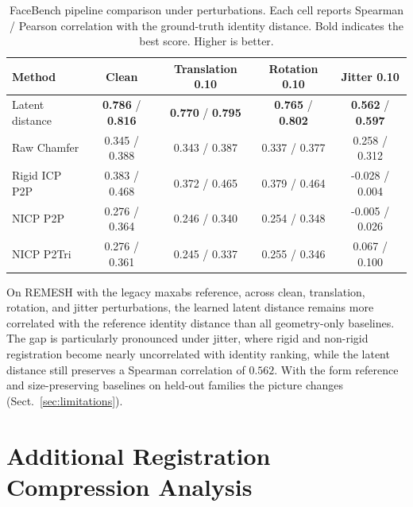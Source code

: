 \documentclass[10pt,twocolumn,letterpaper]{article}
\begin{document}
\begin{table}[h]
\centering
\small
\caption{
FaceBench pipeline comparison under perturbations. Each cell reports Spearman /
Pearson correlation with the ground-truth identity distance. Bold indicates the
best score. Higher is better.
}
\label{tab:facebench_pipeline_perturbed_app}
\begin{tabular}{lcccc}
\toprule
Method & Clean & Translation 0.10 & Rotation 0.10 & Jitter 0.10 \\
\midrule
Latent distance
& \textbf{0.786} / \textbf{0.816}
& \textbf{0.770} / \textbf{0.795}
& \textbf{0.765} / \textbf{0.802}
& \textbf{0.562} / \textbf{0.597} \\

Raw Chamfer
& 0.345 / 0.388
& 0.343 / 0.387
& 0.337 / 0.377
& 0.258 / 0.312 \\

Rigid ICP P2P
& 0.383 / 0.468
& 0.372 / 0.465
& 0.379 / 0.464
& -0.028 / 0.004 \\

NICP P2P
& 0.276 / 0.364
& 0.246 / 0.340
& 0.254 / 0.348
& -0.005 / 0.026 \\

NICP P2Tri
& 0.276 / 0.361
& 0.245 / 0.337
& 0.255 / 0.346
& 0.067 / 0.100 \\
\bottomrule
\end{tabular}
\end{table}

On REMESH with the legacy maxabs reference, across clean, translation, rotation,
and jitter perturbations, the learned latent distance remains more correlated
with the reference identity distance than all geometry-only baselines. The gap
is particularly pronounced under jitter, where rigid and non-rigid registration
become nearly uncorrelated with identity ranking, while the latent distance still
preserves a Spearman correlation of $0.562$. With the form reference and
size-preserving baselines on held-out families the picture changes
(Sect.~\ref{sec:limitations}).

\section{Additional Registration Compression Analysis}
\label{app:compression_analysis}
\end{document}
